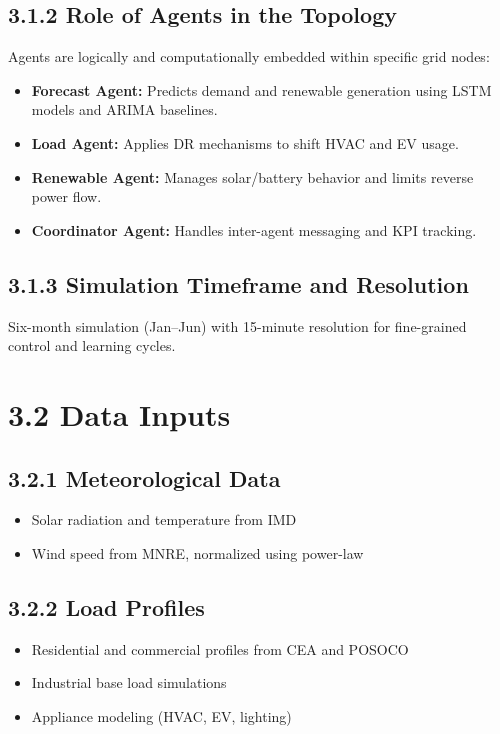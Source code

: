 \documentclass[12pt]{report}
\begin{document}
\subsection*{3.1.2 Role of Agents in the Topology}
Agents are logically and computationally embedded within specific grid nodes:
\begin{itemize}
    \item \textbf{Forecast Agent:} Predicts demand and renewable generation using LSTM models and ARIMA baselines.
    \item \textbf{Load Agent:} Applies DR mechanisms to shift HVAC and EV usage.
    \item \textbf{Renewable Agent:} Manages solar/battery behavior and limits reverse power flow.
    \item \textbf{Coordinator Agent:} Handles inter-agent messaging and KPI tracking.
\end{itemize}

\subsection*{3.1.3 Simulation Timeframe and Resolution}
Six-month simulation (Jan–Jun) with 15-minute resolution for fine-grained control and learning cycles.

\section*{3.2 Data Inputs}

\subsection*{3.2.1 Meteorological Data}
\begin{itemize}
    \item Solar radiation and temperature from IMD
    \item Wind speed from MNRE, normalized using power-law
\end{itemize}

\subsection*{3.2.2 Load Profiles}
\begin{itemize}
    \item Residential and commercial profiles from CEA and POSOCO
    \item Industrial base load simulations
    \item Appliance modeling (HVAC, EV, lighting)
\end{itemize}
\end{document}
